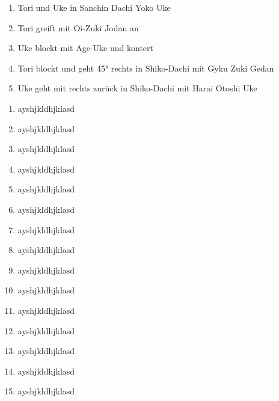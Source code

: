 	\null\vfill\null
\begin{center}
	\begin{minipage}[t]{\textwidth-2\tabcolsep}
		{
		\begin{enumerate}
			\item Tori und Uke in Sanchin Dachi Yoko Uke
			\item Tori greift mit Oi-Zuki Jodan an
			\item Uke blockt mit Age-Uke und kontert
			\item Tori blockt und geht 45° rechts in Shiko-Dachi mit Gyku Zuki Gedan
			\item Uke geht mit rechts zurück in Shiko-Dachi mit Harai Otoshi Uke
		\end{enumerate}
		\begin{multicols}{3}
			\begin{enumerate}
				\item ayshjkldhjklasd
				\item ayshjkldhjklasd
				\item ayshjkldhjklasd
				\item ayshjkldhjklasd
				\item ayshjkldhjklasd
				\item ayshjkldhjklasd
				\item ayshjkldhjklasd
				\item ayshjkldhjklasd
				\item ayshjkldhjklasd
				\item ayshjkldhjklasd
				\item ayshjkldhjklasd
				\item ayshjkldhjklasd
				\item ayshjkldhjklasd
				\item ayshjkldhjklasd
				\item ayshjkldhjklasd
			\end{enumerate}
		\end{multicols}
}
\end{minipage}
\end{center}
